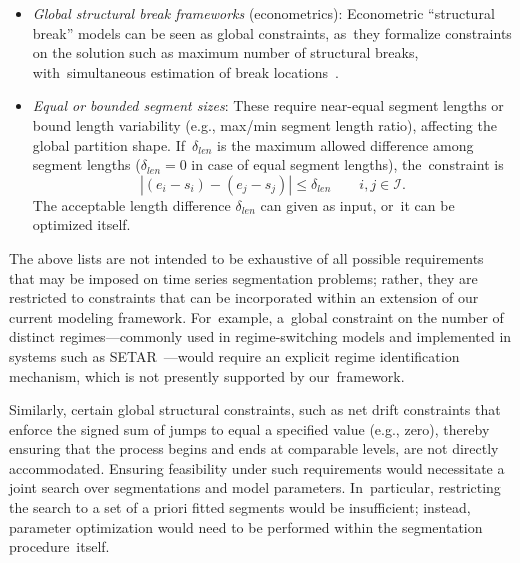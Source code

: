 \documentclass[mathematics,article,accept,pdftex,moreauthors]{Definitions/mdpi}
\begin{document}
\begin{itemize}
	Such constraints may either enforce a specific pattern or restrict its complexity (e.g., by~bounding the number of direction alternations) \cite{HRFB22}. They can also be formulated negatively as forbidden-pattern constraints, excluding certain global configurations. Examples include limiting the total number of alternations to at most $n_a$ or~forbidding recurring structures such as repeated “short–long–short” segment sequences. These formulations amount to global pattern-avoidance constraints on the~segmentation.

	\item {\it Global structural break frameworks} (econometrics):
	Econometric “structural break” models can be seen as global constraints, as~they formalize constraints on the solution such as maximum number of structural breaks, with~simultaneous estimation of break locations~\cite{BP98, CP19}. 
		
	\item {\it Equal or bounded segment sizes}: These require near-equal segment lengths or bound length variability (e.g., max/min segment length ratio), affecting the global partition shape. If~$\delta_{len}$ is the maximum allowed difference among segment lengths ($\delta_{len}=0$ in case of equal segment lengths), the~constraint is
\begin{equation}
		|(e_i - s_i) - (e_j - s_j)| \leq \delta_{len} \qquad i,j\in \mathcal{I}.
	\end{equation}
	The acceptable length difference $\delta_{len}$ can given as input, or~it can be optimized itself.
\end{itemize}

The above lists are not intended to be exhaustive of all possible requirements that may be imposed on time series segmentation problems; rather, they are restricted to constraints that can be incorporated within an extension of our current modeling framework. For~example, a~global constraint on the number of distinct regimes—commonly used in regime-switching models and implemented in systems such as SETAR~\cite{TL90}—would require an explicit regime identification mechanism, which is not presently supported by our~framework.

Similarly, certain global structural constraints, such as net drift constraints that enforce the signed sum of jumps to equal a specified value (e.g., zero), thereby ensuring that the process begins and ends at comparable levels, are not directly accommodated. Ensuring feasibility under such requirements would necessitate a joint search over segmentations and model parameters. In~particular, restricting the search to a set of a priori fitted segments would be insufficient; instead, parameter optimization would need to be performed within the segmentation procedure~itself.
\end{document}
